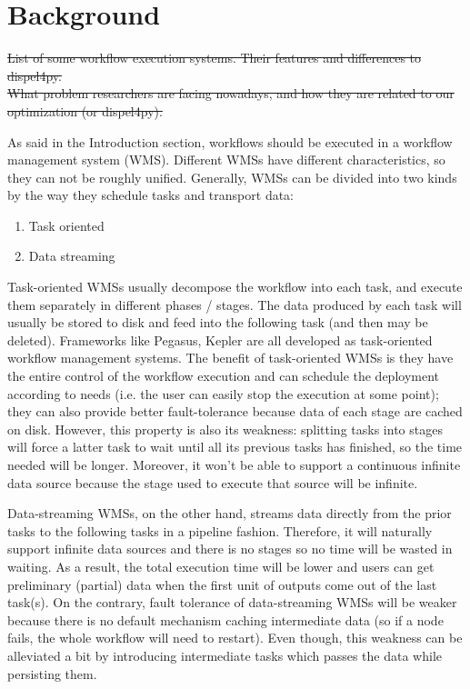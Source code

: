 \documentclass[msc,cs,logo]{infthesis}
\begin{document}
	
	\section{Background}	
	\sout{List of some workflow execution systems. Their features and differences to dispel4py. \\
	What problem researchers are facing nowadays, and how they are related to our optimization (or dispel4py).}
	
	As said in the Introduction section, workflows should be executed in a workflow management system (WMS). Different WMSs have different characteristics, so they can not be roughly unified.
	 Generally, WMSs can be divided into two kinds by the way they schedule tasks and transport data:
	\begin{enumerate}
		\item Task oriented
		\item Data streaming
	\end{enumerate}
	
	Task-oriented WMSs usually decompose the workflow into each task, and execute them separately in different phases / stages. The data produced by each task will usually be stored to disk and feed into the following task (and then may be deleted). Frameworks like Pegasus\cite{deelman2015pegasus}, Kepler\cite{ludascher2006scientific} are all developed as task-oriented workflow management systems. The benefit of task-oriented WMSs is they have the entire control of the workflow execution and can schedule the deployment according to needs (i.e. the user can easily stop the execution at some point); they can also provide better fault-tolerance because data of each stage are cached on disk. However, this property is also its weakness: splitting tasks into stages will force a latter task to wait until all its previous tasks has finished, so the time needed will be longer. Moreover, it won't be able to support a continuous infinite data source because the stage used to execute that source will be infinite.
	
	Data-streaming WMSs, on the other hand, streams data directly from the prior tasks to the following tasks in a pipeline fashion. Therefore, it will naturally support infinite data sources and there is no stages so no time will be wasted in waiting. As a result, the total execution time will be lower and users can get preliminary (partial) data when the first unit of outputs come out of the last task(s). On the contrary, fault tolerance of data-streaming WMSs will be weaker because there is no default mechanism caching intermediate data (so if a node fails, the whole workflow will need to restart). Even though, this weakness can be alleviated a bit by introducing intermediate tasks which passes the data while persisting them.
	
\end{document}
